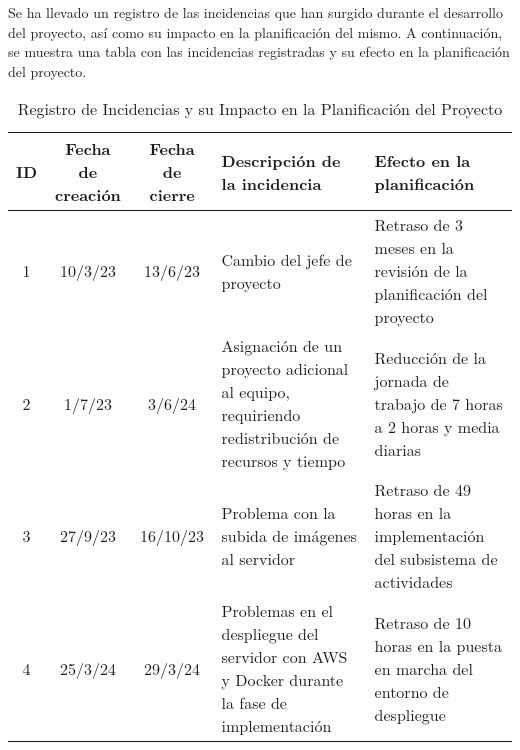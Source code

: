 Se ha llevado un registro de las incidencias que han surgido durante el desarrollo del proyecto, así como su impacto en la planificación del mismo. A continuación, se muestra una tabla con las incidencias registradas y su efecto en la planificación del proyecto.
\begin{table}[H]
	\centering
	\begin{tabular}{ | c |  c | c | m{4.7cm} | m{4.3cm} | }
		\hline
		\textbf{ID} & \textbf{Fecha de creación} & \textbf{Fecha de cierre} & \textbf{Descripción de la incidencia}                                                          & \textbf{Efecto en la planificación}                                     \\
		\hline
		1           & 10/3/23                    & 13/6/23                  & Cambio del jefe de proyecto                                                                    & Retraso de 3 meses en la revisión de la planificación del proyecto      \\
		\hline
		2           & 1/7/23                     & 3/6/24                   & Asignación de un proyecto adicional al equipo, requiriendo redistribución de recursos y tiempo & Reducción de la jornada de trabajo de 7 horas a 2 horas y media diarias \\
		\hline
		3           & 27/9/23                    & 16/10/23                 & Problema con la subida de imágenes al servidor                                                 & Retraso de 49 horas en la implementación del subsistema de actividades  \\
		\hline
		4           & 25/3/24                    & 29/3/24                  & Problemas en el despliegue del servidor con AWS y Docker durante la fase de implementación     & Retraso de 10 horas en la puesta en marcha del entorno de despliegue    \\
		\hline
	\end{tabular}
	\caption{Registro de Incidencias y su Impacto en la Planificación del Proyecto}
\end{table}

